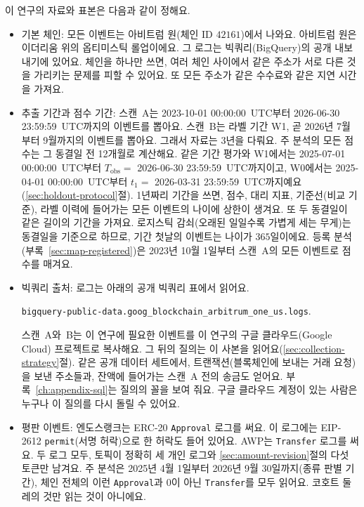 이 연구의 자료와 표본은 다음과 같이 정해요.
\begin{itemize}
\item 기본 체인: 모든 이벤트는 아비트럼 원(체인 ID $42161$)에서 나와요. 아비트럼 원은 이더리움 위의 옵티미스틱 롤업이에요\parencite{thibault2022rollups}. 그 로그는 빅쿼리(BigQuery)의 공개 내보내기에 있어요. 체인을 하나만 쓰면, 여러 체인 사이에서 같은 주소가 서로 다른 것을 가리키는 문제를 피할 수 있어요. 또 모든 주소가 같은 수수료와 같은 지연 시간을 가져요.

\item 추출 기간과 점수 기간: 스캔~A는 2023-10-01 00:00:00~UTC부터 2026-06-30 23:59:59~UTC까지의 이벤트를 뽑아요. 스캔~B는 라벨 기간 W1, 곧 2026년 7월부터 9월까지의 이벤트를 뽑아요. 그래서 자료는 3년을 다뤄요. 주 분석의 모든 점수는 그 동결일 전 12개월로 계산해요. 같은 기간 평가와 W1에서는 2025-07-01 00:00:00~UTC부터 $T_{\mathrm{obs}}=$ 2026-06-30 23:59:59~UTC까지이고, W0에서는 2025-04-01 00:00:00~UTC부터 $t_1=$ 2026-03-31 23:59:59~UTC까지예요(\ref{sec:holdout-protocol}절). 1년짜리 기간을 쓰면, 점수, 대리 지표, 기준선(비교 기준), 라벨 이력에 들어가는 모든 이벤트의 나이에 상한이 생겨요. 또 두 동결일이 같은 길이의 기간을 가져요. 로지스틱 감쇠(오래된 일일수록 가볍게 세는 무게)는 동결일을 기준으로 하므로, 기간 첫날의 이벤트는 나이가 $365$일이에요. 등록 분석(부록~\ref{sec:map-registered})은 2023년 10월 1일부터 스캔~A의 모든 이벤트로 점수를 매겨요.

\item 빅쿼리 출처: 로그는 아래의 공개 빅쿼리 표에서 읽어요.
\begin{center}
\texttt{bigquery-public-data.goog\_blockchain\_arbitrum\_one\_us.logs}.
\end{center}
스캔~A와~B는 이 연구에 필요한 이벤트를 이 연구의 구글 클라우드(Google Cloud) 프로젝트로 복사해요. 그 뒤의 질의는 이 사본을 읽어요(\ref{sec:collection-strategy}절). 같은 공개 데이터 세트에서, 트랜잭션(블록체인에 보내는 거래 요청)을 보낸 주소들과, 잔액에 들어가는 스캔~A 전의 송금도 얻어요. 부록~\ref{ch:appendix-sql}는 질의의 꼴을 보여 줘요. 구글 클라우드 계정이 있는 사람은 누구나 이 질의를 다시 돌릴 수 있어요.

\item 평판 이벤트: 엔도스랭크는 ERC-20 \texttt{Approval} 로그를 써요\parencite{vogelsteller2015erc20}. 이 로그에는 EIP-2612 \texttt{permit}(서명 허락)으로 한 허락도 들어 있어요\parencite{lundfall2020permit}. AWP는 \texttt{Transfer} 로그를 써요. 두 로그 모두, 토픽이 정확히 세 개인 로그와 \ref{sec:amount-revision}절의 다섯 토큰만 남겨요. 주 분석은 2025년 4월 1일부터 2026년 9월 30일까지(종류 판별 기간), 체인 전체의 이런 \texttt{Approval}과 0이 아닌 \texttt{Transfer}를 모두 읽어요. 코호트 둘레의 것만 읽는 것이 아니에요.


\end{itemize}
